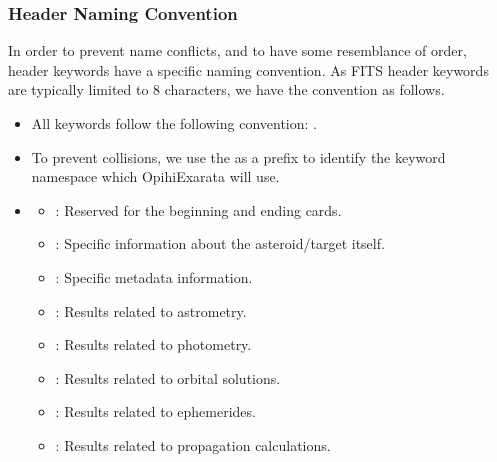 \documentclass[letterpaper,11pt,english]{sphinxmanual}
\begin{document}
\subsubsection{Header Naming Convention}
\label{\detokenize{user/recording_fits_file:header-naming-convention}}
\sphinxAtStartPar
In order to prevent name conflicts, and to have some resemblance of order,
header keywords have a specific naming convention. As FITS header keywords
are typically limited to 8 characters, we have the convention as follows.
\begin{itemize}
\item {} 
\sphinxAtStartPar
All keywords follow the following convention: .

\item {} 
\sphinxAtStartPar
To prevent collisions, we use the  as a prefix to identify the keyword namespace which OpihiExarata will use.

\item {} \begin{description}
\begin{itemize}
\item {} 
\sphinxAtStartPar
\sphinxcode{\sphinxupquote{\_}}: Reserved for the beginning and ending cards.

\item {} 
\sphinxAtStartPar
{}: Specific information about the asteroid/target itself.

\item {} 
\sphinxAtStartPar
{}: Specific metadata information.

\item {} 
\sphinxAtStartPar
{}: Results related to astrometry.

\item {} 
\sphinxAtStartPar
{}: Results related to photometry.

\item {} 
\sphinxAtStartPar
{}: Results related to orbital solutions.

\item {} 
\sphinxAtStartPar
{}: Results related to ephemerides.

\item {} 
\sphinxAtStartPar
{}: Results related to propagation calculations.


\end{itemize}
\end{description}
\end{itemize}
\end{document}

